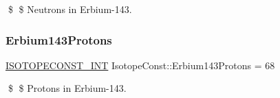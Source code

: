 \$ \$ Neutrons in Erbium-\/143. \mbox{\label{group___isotope_const-_erbium-_er143_gac6292154760b69fa8f98cb9a478edf17}} 
\subsubsection{\texorpdfstring{Erbium143\+Protons}{Erbium143Protons}}
{\footnotesize\ttfamily \mbox{\hyperlink{group___isotope_const-_macros_ga5f18360b3e99483a35c32d789e62621c}{I\+S\+O\+T\+O\+P\+E\+C\+O\+N\+S\+T\+\_\+\+I\+NT}} Isotope\+Const\+::\+Erbium143\+Protons = 68}

\$ \$ Protons in Erbium-\/143. 